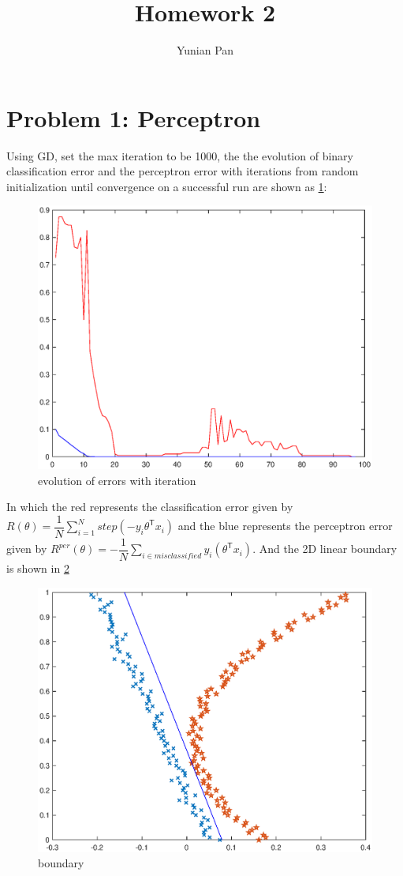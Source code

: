 \documentclass[a4paper,12pt]{article}
\begin{document}
\title{\textbf{Homework 2}}
\author{Yunian Pan}
\maketitle{}

\section{Problem 1: Perceptron}
Using GD, set the max iteration to be 1000, the the evolution of binary classification error and the perceptron error with iterations from random initialization until convergence on a successful run are shown as \ref{1-1}:

\begin{figure}[h]
\centering
\includegraphics[width = .8\textwidth]{figure/1_1.eps}
\caption{evolution of errors with iteration}
\label{1-1}
\end{figure}

In which the red represents the classification error given by $R(\theta ) = \dfrac{1}{N} \sum_{i=1}^{N} step(-y_i \theta ^\mathsf{T} x_i)$ and the blue represents the perceptron error given by $R^{per}(\theta) = -\dfrac{1}{N} \sum_{i \in misclassified} y_i (\theta^\mathsf{T} x_i)$. And the 2D linear boundary is shown in \ref{1-2}

\begin{figure}[h]
\centering
\includegraphics[width = .8\textwidth]{figure/1_2.eps}
\caption{boundary}
\label{1-2}
\end{figure}
\end{document}
